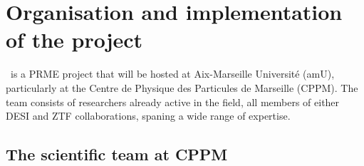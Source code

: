 \section{Organisation and implementation of the project}


 
\projacro\ is a PRME project that will be hosted at Aix-Marseille Université (amU), 
particularly at the Centre de Physique des Particules de Marseille (CPPM). 
The team consists of researchers already active in the field, all members of either 
DESI and ZTF collaborations, spaning a wide range of expertise. 




    
\subsection{The scientific team at CPPM}

